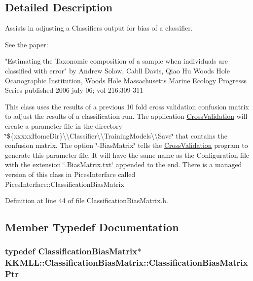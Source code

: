 \subsection{Detailed Description}
Assists in adjusting a Classifiers output for bias of a classifier. 

See the paper\+: 
\begin{DoxyCode}
\textcolor{stringliteral}{"Estimating the Taxonomic composition of a sample when individuals are classified with error"}
by Andrew Solow, Cabll Davis, Qiao Hu
Woods Hole Ocanographic Institution, Woods Hole Massachusetts
Marine Ecology Progresss Series
published 2006-july-06;  vol 216:309-311
\end{DoxyCode}
 This class uses the results of a previous 10 fold cross validation confusion matrix to adjust the results of a classification run. The application \hyperlink{class_k_k_m_l_l_1_1_cross_validation}{Cross\+Validation} will create a parameter file in the directory \char`\"{}\$\{xxxxx\+Home\+Dir\}\textbackslash{}\textbackslash{}\+Classifier\textbackslash{}\textbackslash{}\+Training\+Models\textbackslash{}\textbackslash{}\+Save\char`\"{} that contains the confusion matrix. The option \char`\"{}-\/\+Bias\+Matrix\char`\"{} tells the \hyperlink{class_k_k_m_l_l_1_1_cross_validation}{Cross\+Validation} program to generate this parameter file. It will have the same name as the Configuration file with the extension \char`\"{}.\+Bias\+Matrix.\+txt\char`\"{} appended to the end. There is a managed version of this class in Pices\+Interface called Pices\+Interface\+::\+Classification\+Bias\+Matrix 

Definition at line 44 of file Classification\+Bias\+Matrix.\+h.



\subsection{Member Typedef Documentation}
\subsubsection[{\texorpdfstring{Classification\+Bias\+Matrix\+Ptr}{ClassificationBiasMatrixPtr}}]{\setlength{\rightskip}{0pt plus 5cm}typedef {\bf Classification\+Bias\+Matrix}$\ast$ {\bf K\+K\+M\+L\+L\+::\+Classification\+Bias\+Matrix\+::\+Classification\+Bias\+Matrix\+Ptr}}\hypertarget{class_k_k_m_l_l_1_1_classification_bias_matrix_a62b9ebf8fa4f7669dec9248876945bff}{}\label{class_k_k_m_l_l_1_1_classification_bias_matrix_a62b9ebf8fa4f7669dec9248876945bff}


